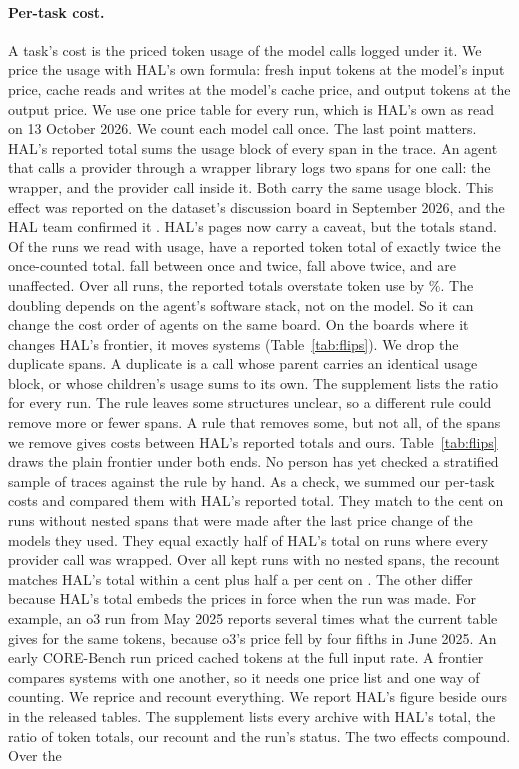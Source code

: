 \documentclass[11pt]{article}
\begin{document}
\paragraph{Per-task cost.}
A task's cost is the priced token usage of the model calls logged under it. We price the usage with HAL's own formula: fresh input tokens at the model's input price, cache reads and writes at the model's cache price, and output tokens at the output price. We use one price table for every run, which is HAL's own as read on 13 October 2026. We count each model call once. The last point matters. HAL's reported total sums the usage block of every span in the trace. An agent that calls a provider through a wrapper library logs two spans for one call: the wrapper, and the provider call inside it. Both carry the same usage block. This effect was reported on the dataset's discussion board in September 2026, and the HAL team confirmed it \citep{liu2026halissues}. HAL's pages now carry a caveat, but the totals stand. Of the \NumDupRunsTotal{} runs we read with usage, \NumDupRunsExactlyTwo{} have a reported token total of exactly twice the once-counted total. \NumDupRunsBetween{} fall between once and twice, \NumDupRunsAboveTwo{} fall above twice, and \NumDupRunsOne{} are unaffected. Over all runs, the reported totals overstate token use by \NumDupOverstatementPct\%. The doubling depends on the agent's software stack, not on the model. So it can change the cost order of agents on the same board. On the boards where it changes HAL's frontier, it moves \NumFlipCounting{} systems (Table~\ref{tab:flips}). We drop the duplicate spans. A duplicate is a call whose parent carries an identical usage block, or whose children's usage sums to its own. The supplement lists the ratio for every run. The rule leaves some structures unclear, so a different rule could remove more or fewer spans. A rule that removes some, but not all, of the spans we remove gives costs between HAL's reported totals and ours. Table~\ref{tab:flips} draws the plain frontier under both ends. No person has yet checked a stratified sample of traces against the rule by hand. As a check, we summed our per-task costs and compared them with HAL's reported total. They match to the cent on runs without nested spans that were made after the last price change of the models they used. They equal exactly half of HAL's total on runs where every provider call was wrapped. Over all \NumRecountUnnested{} kept runs with no nested spans, the recount matches HAL's total within a cent plus half a per cent on \NumRecountMatch{}. The other \NumRecountOff{} differ because HAL's total embeds the prices in force when the run was made. For example, an o3 run from May 2025 reports several times what the current table gives for the same tokens, because o3's price fell by four fifths in June 2025. An early CORE-Bench run priced cached tokens at the full input rate. A frontier compares systems with one another, so it needs one price list and one way of counting. We reprice and recount everything. We report HAL's figure beside ours in the released tables. The supplement lists every archive with HAL's total, the ratio of token totals, our recount and the run's status. The two effects compound. Over the \NumCostRatioRuns{} 
\end{document}

